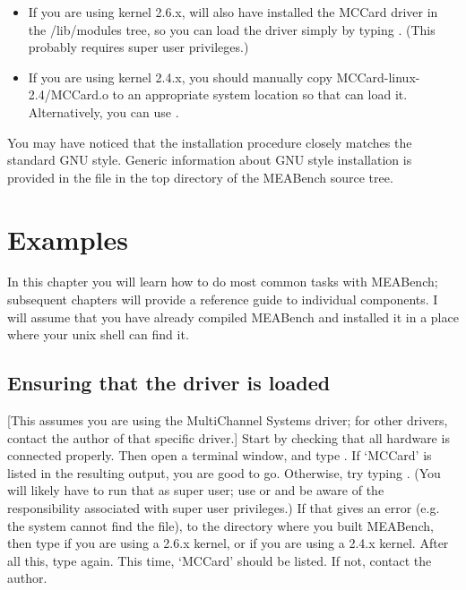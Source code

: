 \documentclass[12pt,oneside]{book}
\def\meabench{{MEABench}\xspace}
\def\prog#1{{\bf #1}}
\def\filename#1{{\sf #1}\xspace}
\begin{document}
\begin{itemize}
\prog{mea} from the \meabench `bin' directory to a location in your
path. That will allow you to run \meabench programs by typing, e.g.,
.
\item If you are using kernel 2.6.x,   will also have 
installed the MCCard driver in the \filename{/lib/modules} tree, so
you can load the driver simply by typing . 
(This probably requires super user privileges.)
\item If you are using kernel 2.4.x, you should manually copy  
\filename{MCCard-linux-2.4/MCCard.o} to an appropriate system location 
so that  can load it. Alternatively, you can use
.
\end{itemize}

You may have noticed that the installation procedure closely matches
the standard GNU style. Generic information about GNU style
installation is provided in the file  in the top
directory of the \meabench source tree.


\chapter{Examples}\label{chap:examples}

In this chapter you will learn how to do most common tasks with
\meabench; subsequent chapters will provide a reference guide to
individual components. I will assume that you have already compiled
\meabench and installed it in a place where your unix shell can find it.

\section{Ensuring that the driver is loaded}

[This assumes you are using the MultiChannel Systems driver; for other
drivers, contact the author of that specific driver.] Start by
checking that all hardware is connected properly. Then open a terminal
window, and type . If `MCCard' is listed in the resulting
output, you are good to go. Otherwise, try typing
. (You will likely have to run that as super
user; use  or  and be aware of the
responsibility associated with super user privileges.) If that gives
an error (e.g. the system cannot find the file),  to the
directory where you built \meabench, then type  if you are using a 2.6.x kernel, or
 if you are using a 2.4.x
kernel. After all this, type  again. This time, `MCCard'
should be listed. If not, contact the author.
\end{document}
